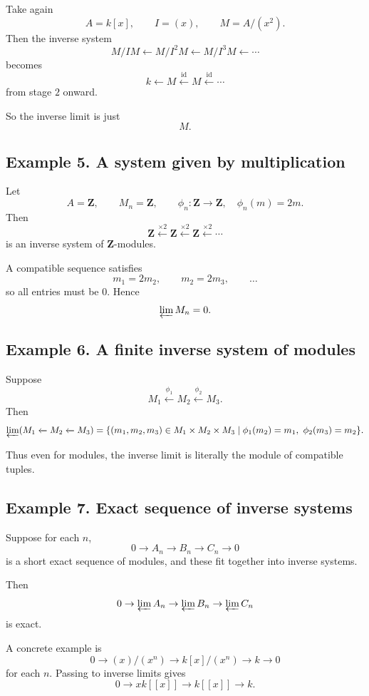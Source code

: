 \documentclass[12pt,a4paper]{article}
\theoremstyle{plain}
\theoremstyle{definition}      %
\begin{document}
	Take again
	\[
	A=k[x],\qquad I=(x),\qquad M=A/(x^2).
	\]
	Then the inverse system
	\[
	M/IM \xleftarrow{} M/I^2M \xleftarrow{} M/I^3M \xleftarrow{}\cdots
	\]
	becomes
	\[
	k \xleftarrow{} M \xleftarrow{\mathrm{id}} M \xleftarrow{\mathrm{id}} \cdots
	\]
	from stage \(2\) onward.
	
	So the inverse limit is just
	\[
	M.
	\]
	
	\subsection*{Example 5. A system given by multiplication}
	
	Let
	\[
	A=\mathbf Z,\qquad M_n=\mathbf Z,
	\qquad \phi_n:\mathbf Z\to\mathbf Z,\quad \phi_n(m)=2m.
	\]
	Then
	\[
	\mathbf Z \xleftarrow{\times 2} \mathbf Z \xleftarrow{\times 2} \mathbf Z \xleftarrow{\times 2}\cdots
	\]
	is an inverse system of \(\mathbf Z\)-modules.
	
	A compatible sequence satisfies
	\[
	m_1=2m_2,\qquad m_2=2m_3,\qquad \dots
	\]
	so all entries must be \(0\). Hence
	\[
	\varprojlim M_n=0.
	\]
	
	\subsection*{Example 6. A finite inverse system of modules}
	
	Suppose
	\[
	M_1 \xleftarrow{\phi_1} M_2 \xleftarrow{\phi_2} M_3.
	\]
	Then
	\[
	\varprojlim(M_1 \xleftarrow{} M_2 \xleftarrow{} M_3)
	=
	\{(m_1,m_2,m_3)\in M_1\times M_2\times M_3
	\mid \phi_1(m_2)=m_1,\ \phi_2(m_3)=m_2\}.
	\]
	
	Thus even for modules, the inverse limit is literally the module of compatible tuples.
	
	\subsection*{Example 7. Exact sequence of inverse systems}
	
	Suppose for each \(n\),
	\[
	0\to A_n\to B_n\to C_n\to 0
	\]
	is a short exact sequence of modules, and these fit together into inverse systems.
	
	Then
	\[
	0\to \varprojlim A_n \to \varprojlim B_n \to \varprojlim C_n
	\]
	is exact.
	
	A concrete example is
	\[
	0\to (x)/(x^n)\to k[x]/(x^n)\to k\to 0
	\]
	for each \(n\). Passing to inverse limits gives
	\[
	0\to xk[[x]]\to k[[x]]\to k.
	\]
	
\end{document}
